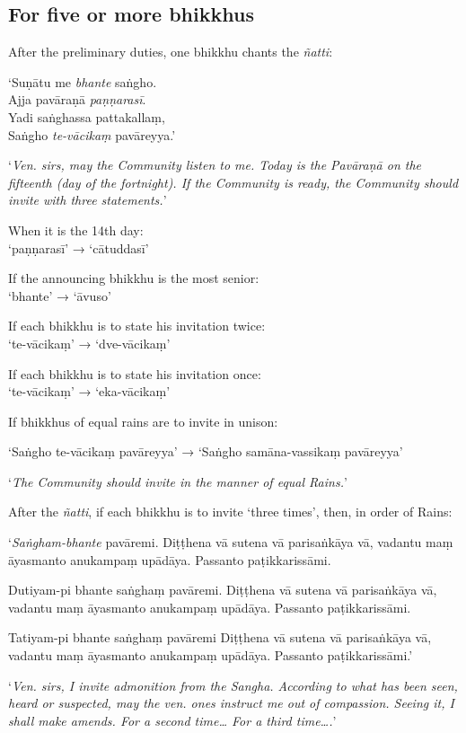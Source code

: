 \subsection{For five or more bhikkhus}

After the preliminary duties, one bhikkhu chants the \emph{ñatti}:

‘Suṇātu me \emph{bhante} saṅgho.\\
Ajja pavāraṇā \emph{paṇṇarasī}.\\
Yadi saṅghassa pattakallaṃ,\\
Saṅgho \emph{te-vācikaṃ} pavāreyya.’

‘\emph{Ven. sirs, may the Community listen to me. Today is the Pavāraṇā on the
  fifteenth (day of the fortnight). If the Community is ready, the Community
  should invite with three statements.}’


When it is the 14th day:\\
‘paṇṇarasī’ → ‘cātuddasī’

If the announcing bhikkhu is the most senior:\\
‘bhante’ → ‘āvuso’

If each bhikkhu is to state his invitation twice:\\
‘te-vācikaṃ’ → ‘dve-vācikaṃ’

If each bhikkhu is to state his invitation once:\\
‘te-vācikaṃ’ → ‘eka-vācikaṃ’

If bhikkhus of equal rains are to invite in unison:

‘Saṅgho te-vācikaṃ pavāreyya’ → ‘Saṅgho samāna-vassikaṃ pavāreyya’

‘\emph{The Community should invite in the manner of equal Rains.}’

After the \emph{ñatti}, if each bhikkhu is to invite ‘three times’, then, in
order of Rains:

‘\emph{Saṅgham-bhante} pavāremi. Diṭṭhena vā sutena vā parisaṅkāya vā, vadantu
maṃ āyasmanto anukampaṃ upādāya. Passanto paṭikkarissāmi.

Dutiyam-pi bhante saṅghaṃ pavāremi. Diṭṭhena vā sutena vā parisaṅkāya vā,
vadantu maṃ āyasmanto anukampaṃ upādāya. Passanto paṭikkarissāmi.

Tatiyam-pi bhante saṅghaṃ pavāremi Diṭṭhena vā sutena vā parisaṅkāya vā, vadantu
maṃ āyasmanto anukampaṃ upādāya. Passanto paṭikkarissāmi.’

‘\emph{Ven. sirs, I invite admonition from the Sangha. According to what has
  been seen, heard or suspected, may the ven. ones instruct me out of
  compassion. Seeing it, I shall make amends. For a second time… For a third
  time….}’

